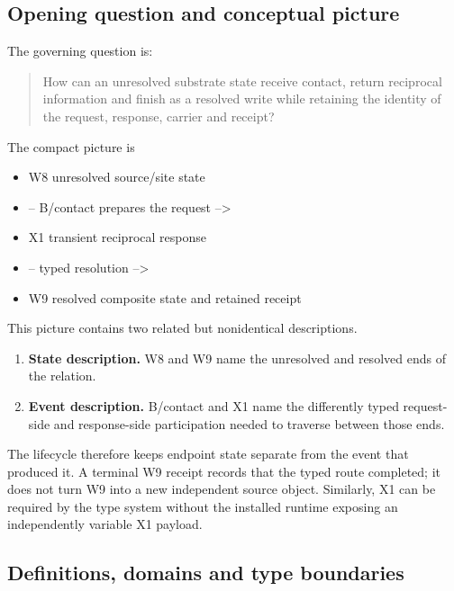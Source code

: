 \subsection{Opening question and conceptual
picture}\label{viii-ch05-opening-question-and-conceptual-picture}

The governing question is:

\begin{quote}
How can an unresolved substrate state receive contact, return reciprocal
information and finish as a resolved write while retaining the identity
of the request, response, carrier and receipt?
\end{quote}

The compact picture is

\begin{itemize}
\tightlist
\item
  W8 unresolved source/site state
\item
  -- B/contact prepares the request --\textgreater{}
\item
  X1 transient reciprocal response
\item
  -- typed resolution --\textgreater{}
\item
  W9 resolved composite state and retained receipt
\end{itemize}

This picture contains two related but nonidentical descriptions.

\begin{enumerate}
\def\labelenumi{\arabic{enumi}.}
\tightlist
\item
  \textbf{State description.} W8 and W9 name the unresolved and resolved
  ends of the relation.
\item
  \textbf{Event description.} B/contact and X1 name the differently
  typed request-side and response-side participation needed to traverse
  between those ends.
\end{enumerate}

The lifecycle therefore keeps endpoint state separate from the event
that produced it. A terminal W9 receipt records that the typed route
completed; it does not turn W9 into a new independent source object.
Similarly, X1 can be required by the type system without the installed
runtime exposing an independently variable X1 payload.

\subsection{Definitions, domains and type
boundaries}\label{viii-ch05-definitions-domains-and-type-boundaries}

